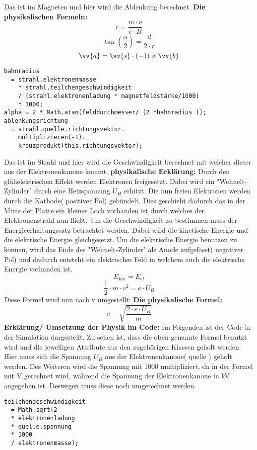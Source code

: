Das ist im Magneten und hier wird die Ablenkung berechnet.
\newline \textbf{Die physikalischen Formeln:}
$$ r = \frac{m \cdot v}{e \cdot B}$$
$$ \tan(\frac{\alpha}{2}) = \frac{d}{2 \cdot r}$$
$$ \vv{a} = \vv{s} \cdot (-1) \times \vv{b}$$
\begin{lstlisting}
bahnradius 
  = strahl.elektronenmasse 
    * strahl.teilchengeschwindigkeit 
    / (strahl.elektronenladung * magnetfeldstärke/1000)
    * 1000;
alpha = 2 * Math.atan(felddurchmesser/ (2 *bahnradius ));
ablenkungsrichtung
  = strahl.quelle.richtungsvektor.
    multiplizieren(-1).
    kreuzprodukt(this.richtungsvektor);
\end{lstlisting}

Das ist im Strahl und hier wird die Geschwindigkeit berechnet mit welcher dieser aus der Elektronenkanone kommt. 
\newline \textbf{physikalische Erklärung:}
\newline Durch den glühelektrischen Effekt werden Elektronen freigesetzt. Dabei wird ein "Wehnelt-Zylinder" durch eine Heizspannung $U_H$ erhitzt. Die nun freien Elektronen werden durch die Kathode( positiver Pol) gebündelt. Dies geschieht dadurch das in der Mitte der Platte ein kleines Loch vorhanden ist durch welches der Elektronenstrahl nun fließt. Um die Geschwindigkeit zu bestimmen muss der Energieerhaltungssatz betrachtet werden. Dabei wird die kinetische Energie und die elektrische Energie gleichgesetzt. Um die elektrische Energie benutzen zu können, wird das Ende des "Wehnelt-Zylinder" als Anode aufgefasst( negativer Pol) und dadurch entsteht ein elektrisches Feld in welchem auch die elektrische Energie vorhanden ist. 
$$ E_{kin} = E_{el}$$
$$ \frac{1}{2} \cdot m \cdot v^2 = e \cdot U_B$$
Diese Formel wird  nun nach v umgestellt:
\newline \textbf{Die physikalische Formel:}
$$ v = \sqrt{\frac{2 \cdot e \cdot U_B}{m}}$$
\newline \textbf{Erklärung/ Umsetzung der Physik im Code:}
\newline Im Folgenden ist der Code in der Simulation dargestellt. Zu sehen ist, dass die oben genannte Formel benutzt wird und die jeweiligen Attribute aus den zugehörigen Klassen geholt werden. Hier muss sich die Spannung $U_B$ aus der Elektronenkanone( quelle ) geholt werden. Des Weiteren wird die Spannung mit 1000 multipliziert, da in der Formel mit V gerechnet wird, während die Spannung der Elektronenkanone in kV angegeben ist. Deswegen muss diese noch umgerechnet werden.
\begin{lstlisting}
teilchengeschwindigkeit 
  = Math.sqrt(2 
  * elektronenladung 
  * quelle.spannung 
  * 1000 
  / elektronenmasse);
\end{lstlisting}

